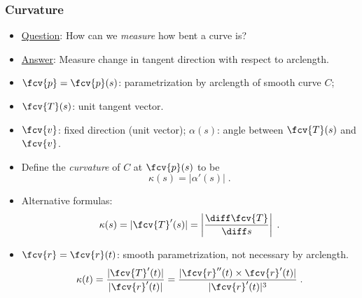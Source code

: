\begin{frame}
\frametitle{Curvature}
\begin{itemize}
\item \underline{Question}: How can we \emph{measure} how bent a curve is?
\item<2-> \underline{Answer}: Measure change in tangent direction with respect to arclength.
\item<3-> $\fcv{p}=\fcv{p}(s)$: parametrization by arclength of smooth curve $C$;
\item<4-> $\fcv{T}(s)$: unit tangent vector.
\item<5-> $\fcv{v}$: fixed direction (unit vector); $\alpha(s)$: angle between $\fcv{T}(s)$ and $\fcv{v}$.
\item<6-> Define the \emph{curvature} of $C$ at $\fcv{p}(s)$ to be
\[\kappa(s) = \left| \alpha'(s) \right|\; .
\]
\item<7-> Alternative formulas: \[\kappa(s) = | \fcv{T}'(s) | = \left| \frac{\diff\fcv{T}}{\diff s}\right| \; .\]
\item<8-> $\fcv{r}=\fcv{r}(t)$: smooth parametrization, not necessary by arclength.
\[\kappa(t) = \frac{|\fcv{T}'(t)|}{|\fcv{r}'(t)|} = \frac{|\fcv{r}''(t) \times \fcv{r}'(t)|}{|\fcv{r}'(t)|^3}\; .
\]
\end{itemize} 
\end{frame}